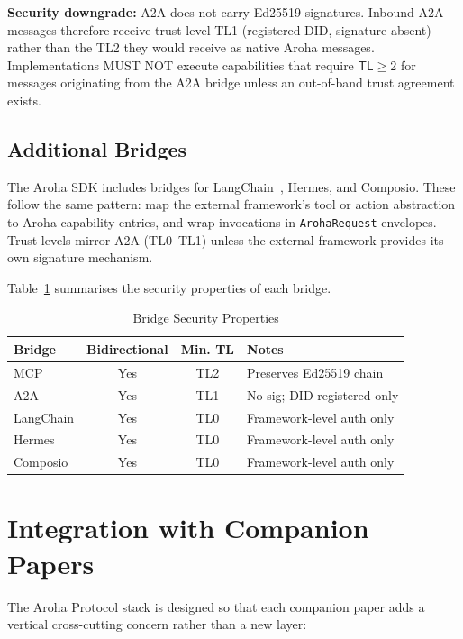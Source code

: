 \documentclass[conference]{IEEEtran}
\newcommand{\TL}{\mathsf{TL}}
\begin{document}
\textbf{Security downgrade:} A2A does not carry Ed25519
signatures. Inbound A2A messages therefore receive trust level
TL1 (registered DID, signature absent) rather than the TL2
they would receive as native Aroha messages. Implementations
MUST NOT execute capabilities that require $\TL \geq 2$ for
messages originating from the A2A bridge unless an out-of-band
trust agreement exists.

\subsection{Additional Bridges}

The Aroha SDK includes bridges for LangChain~\cite{harrison2022langchain},
Hermes, and Composio. These follow the same pattern: map the
external framework's tool or action abstraction to Aroha
capability entries, and wrap invocations in
\texttt{ArohaRequest} envelopes. Trust levels mirror A2A
(TL0--TL1) unless the external framework provides its own
signature mechanism.

Table~\ref{tab:bridges} summarises the security properties of
each bridge.

\begin{table}[t]
\centering
\caption{Bridge Security Properties}
\label{tab:bridges}
\begin{tabular}{@{}lccl@{}}
\toprule
\textbf{Bridge} & \textbf{Bidirectional} &
  \textbf{Min. TL} & \textbf{Notes} \\
\midrule
MCP           & Yes & TL2 & Preserves Ed25519 chain \\
A2A           & Yes & TL1 & No sig; DID-registered only \\
LangChain     & Yes & TL0 & Framework-level auth only \\
Hermes        & Yes & TL0 & Framework-level auth only \\
Composio      & Yes & TL0 & Framework-level auth only \\
\bottomrule
\end{tabular}
\end{table}

\section{Integration with Companion Papers}
\label{sec:companion}

The Aroha Protocol stack is designed so that each companion
paper adds a vertical cross-cutting concern rather than a new
layer:
\end{document}
